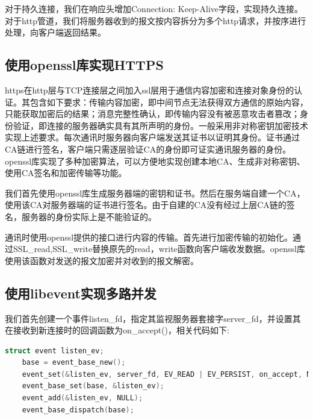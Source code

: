 \documentclass[a4paper]{article}
\begin{document}
对于持久连接，我们在响应头增加Connection: Keep-Alive字段，实现持久连接。
对于http管道，我们将服务器收到的报文按内容拆分为多个http请求，并按序进行处理，向客户端返回结果。


\subsection{使用openssl库实现HTTPS}

https在http层与TCP连接层之间加入ssl层用于通信内容加密和连接对象身份的认证。其包含如下要求：传输内容加密，即中间节点无法获得双方通信的原始内容，只能获取加密后的结果；消息完整性确认，即传输内容没有被恶意攻击者篡改；身份验证，即连接的服务器确实具有其所声明的身份。一般采用非对称密钥加密技术实现上述要求。每次通讯时服务器向客户端发送其证书以证明其身份。证书通过CA链进行签名，客户端只需逐层验证CA的身份即可证实通讯服务器的身份。openssl库实现了多种加密算法，可以方便地实现创建本地CA、生成非对称密钥、使用CA签名和加密传输等功能。

我们首先使用openssl库生成服务器端的密钥和证书。然后在服务端自建一个CA，使用该CA对服务器端的证书进行签名。由于自建的CA没有经过上层CA链的签名，服务器的身份实际上是不能验证的。

通讯时使用openssl提供的接口进行内容的传输。首先进行加密传输的初始化。通过SSL\_read,SSL\_write替换原先的read，write函数向客户端收发数据。openssl库使用该函数对发送的报文加密并对收到的报文解密。

\subsection{使用libevent实现多路并发}
我们首先创建一个事件listen\_fd，指定其监视服务器套接字server\_fd，并设置其在接收到新连接时的回调函数为on\_accept()，相关代码如下:
\begin{lstlisting}[language=C,title=server.c]
  struct event listen_ev;
	base = event_base_new();
	event_set(&listen_ev, server_fd, EV_READ | EV_PERSIST, on_accept, NULL);
	event_base_set(base, &listen_ev);
	event_add(&listen_ev, NULL);
	event_base_dispatch(base);
\end{lstlisting}
\end{document}
